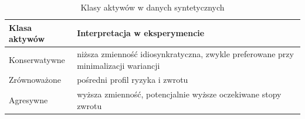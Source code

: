 \begin{table}[H]
\centering
\caption{Klasy aktywów w danych syntetycznych}
\begin{tabular}{p{}p{}}
\toprule
Klasa aktywów & Interpretacja w eksperymencie \\
\midrule
Konserwatywne & niższa zmienność idiosynkratyczna, zwykle preferowane przy minimalizacji wariancji \\
Zrównoważone & pośredni profil ryzyka i zwrotu \\
Agresywne & wyższa zmienność, potencjalnie wyższe oczekiwane stopy zwrotu \\
\bottomrule
\end{tabular}
\end{table}
